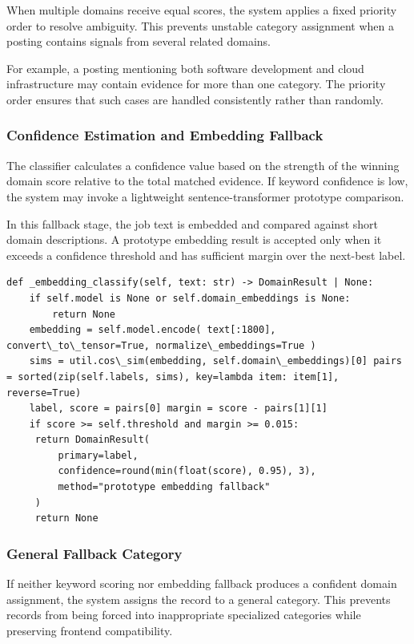 When multiple domains receive equal scores, the system applies a fixed priority order to resolve ambiguity. This prevents unstable category assignment when a posting contains signals from several related domains.

For example, a posting mentioning both software development and cloud infrastructure may contain evidence for more than one category. The priority order ensures that such cases are handled consistently rather than randomly.

\subsubsection*{Confidence Estimation and Embedding Fallback}

The classifier calculates a confidence value based on the strength of the winning domain score relative to the total matched evidence. If keyword confidence is low, the system may invoke a lightweight sentence-transformer prototype comparison.

In this fallback stage, the job text is embedded and compared against short domain descriptions. A prototype embedding result is accepted only when it exceeds a confidence threshold and has sufficient margin over the next-best label.

\clearpage
\begin{lstlisting}[caption={Simplified prototype embedding fallback}]
def _embedding_classify(self, text: str) -> DomainResult | None:
    if self.model is None or self.domain_embeddings is None:
        return None
    embedding = self.model.encode( text[:1800], convert\_to\_tensor=True, normalize\_embeddings=True )
    sims = util.cos\_sim(embedding, self.domain\_embeddings)[0] pairs = sorted(zip(self.labels, sims), key=lambda item: item[1], reverse=True)
    label, score = pairs[0] margin = score - pairs[1][1]
    if score >= self.threshold and margin >= 0.015:
     return DomainResult(
         primary=label,
         confidence=round(min(float(score), 0.95), 3),
         method="prototype embedding fallback"
     )
     return None
\end{lstlisting}

\subsubsection*{General Fallback Category}

If neither keyword scoring nor embedding fallback produces a confident domain assignment, the system assigns the record to a general category. This prevents records from being forced into inappropriate specialized categories while preserving frontend compatibility.


